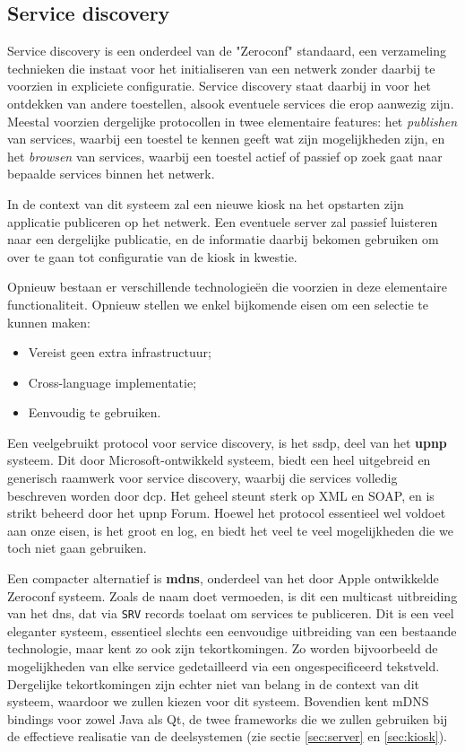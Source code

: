 \subsection{Service discovery}

Service discovery is een onderdeel van de "Zeroconf" standaard, een verzameling technieken die instaat voor het initialiseren van een netwerk zonder daarbij te voorzien in expliciete configuratie. Service discovery staat daarbij in voor het ontdekken van andere toestellen, alsook eventuele services die erop aanwezig zijn. Meestal voorzien dergelijke protocollen in twee elementaire features: het \emph{publishen} van services, waarbij een toestel te kennen geeft wat zijn mogelijkheden zijn, en het \emph{browsen} van services, waarbij een toestel actief of passief op zoek gaat naar bepaalde services binnen het netwerk.

In de context van dit systeem zal een nieuwe kiosk na het opstarten zijn applicatie publiceren op het netwerk. Een eventuele server zal passief luisteren naar een dergelijke publicatie, en de informatie daarbij bekomen gebruiken om over te gaan tot configuratie van de kiosk in kwestie.

Opnieuw bestaan er verschillende technologieën die voorzien in deze elementaire functionaliteit. Opnieuw stellen we enkel bijkomende eisen om een selectie te kunnen maken:
\begin{itemize}
\item Vereist geen extra infrastructuur;
\item Cross-language implementatie;
\item Eenvoudig te gebruiken.
\end{itemize}

Een veelgebruikt protocol voor service discovery, is het \ac{ssdp}, deel van het \textbf{\ac{upnp}} systeem. Dit door Microsoft-ontwikkeld systeem, biedt een heel uitgebreid en generisch raamwerk voor service discovery, waarbij die services volledig beschreven worden door \ac{dcp}. Het geheel steunt sterk op XML en SOAP, en is strikt beheerd door het \ac{upnp} Forum. Hoewel het protocol essentieel wel voldoet aan onze eisen, is het groot en log, en biedt het veel te veel mogelijkheden die we toch niet gaan gebruiken.

Een compacter alternatief is \textbf{\ac{mdns}}, onderdeel van het door Apple ontwikkelde Zeroconf systeem. Zoals de naam doet vermoeden, is dit een multicast uitbreiding van het \ac{dns}, dat via \texttt{SRV} records toelaat om services te publiceren. Dit is een veel eleganter systeem, essentieel slechts een eenvoudige uitbreiding van een bestaande technologie, maar kent zo ook zijn tekortkomingen. Zo worden bijvoorbeeld de mogelijkheden van elke service gedetailleerd via een ongespecificeerd tekstveld. Dergelijke tekortkomingen zijn echter niet van belang in de context van dit systeem, waardoor we zullen kiezen voor dit systeem. Bovendien kent mDNS bindings voor zowel Java als Qt, de twee frameworks die we zullen gebruiken bij de effectieve realisatie van de deelsystemen (zie sectie \ref{sec:server} en \ref{sec:kiosk}).

